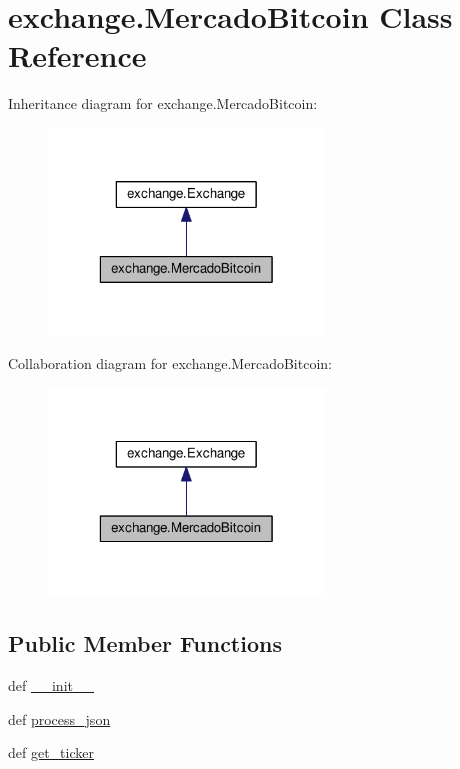 \hypertarget{classexchange_1_1_mercado_bitcoin}{\section{exchange.\-Mercado\-Bitcoin Class Reference}
\label{classexchange_1_1_mercado_bitcoin}
}


Inheritance diagram for exchange.\-Mercado\-Bitcoin\-:
\nopagebreak
\begin{figure}[H]
\begin{center}
\leavevmode
\includegraphics[width=208pt]{classexchange_1_1_mercado_bitcoin__inherit__graph}
\end{center}
\end{figure}


Collaboration diagram for exchange.\-Mercado\-Bitcoin\-:
\nopagebreak
\begin{figure}[H]
\begin{center}
\leavevmode
\includegraphics[width=208pt]{classexchange_1_1_mercado_bitcoin__coll__graph}
\end{center}
\end{figure}
\subsection*{Public Member Functions}
\begin{DoxyCompactItemize}
\item 
def \hyperlink{classexchange_1_1_mercado_bitcoin_ad9e1645fbd904d31d0db7728a2470a90}{\-\_\-\-\_\-init\-\_\-\-\_\-}
\item 
def \hyperlink{classexchange_1_1_mercado_bitcoin_a265e83673337b0b06cb4566ee0903e2f}{process\-\_\-json}
\item 
def \hyperlink{classexchange_1_1_mercado_bitcoin_ae651664c24cb7b31973cdf2cdf281628}{get\-\_\-ticker}
\end{DoxyCompactItemize}
